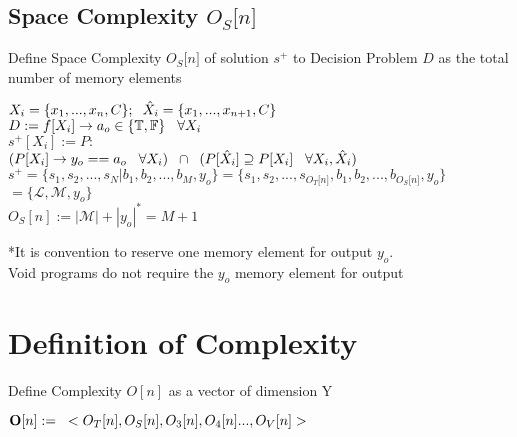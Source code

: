 \documentclass[11pt]{article}
\begin{document}
\subsection{Space Complexity $O_S \lbrack n \rbrack$}
Define Space Complexity $O_S \lbrack n \rbrack$ of solution $s^+$ to Decision Problem $D$ as the total number of memory elements
\begin{center}
\vspace{1mm}
$
X_i = \{x_1,...,x_n,C\}; \hspace{2mm} \hat{X}_i = \{x_1,...,x_{n+1},C\}
$
\\ \vspace{4mm}
$
D := f \lbrack X_i \rbrack \rightarrow a_{o} \in \{\mathbb{T}, \mathbb{F}\} \hspace{3mm} \forall X_i
$
\\ \vspace{4mm}
$
s^+[X_i] := P :
$
\\ \vspace{2mm}
$
(P \lbrack X_i \rbrack \rightarrow y_{o} == a_{o} \hspace{3mm} \forall X_i) \hspace{2mm} \cap \hspace{2mm} (P[\hat{X}_i] \supseteq P[X_i] \hspace{3mm} \forall X_i,\hat{X}_i)
$
\\ \vspace{4mm}
$
s^+ = \{ s_1,s_2,...,s_N|b_1,b_2,...,b_M,y_o\} = \{ s_1,s_2,...,s_{O_T \lbrack n \rbrack }, b_1, b_2,...,b_{O_S \lbrack n \rbrack},y_o \}
$
\\ \vspace{2mm}
$
= \{ \mathcal{L},\mathcal{M},y_o\}
$
\\ \vspace{3mm}
$
O_S[n] := |\mathcal{M}|+|y_o|^* = M + 1
$
\end{center}
\vspace{2mm}
*It is convention to reserve one memory element for output $y_o$.\\
Void programs do not require the $y_o$ memory element for output




\section{Definition of Complexity}
Define Complexity $O[n]$ as a vector of dimension Y
\begin{center}
$
\bold{O}[n] := \hspace{3mm} < O_T [n], O_S [n],O_3[n],O_4[n]...,O_V[n]>
$
\end{center}
\end{document}
